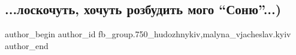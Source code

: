  
 
 
 
 

\subsection{...лоскочуть,  хочуть розбудить мого \enquote{Соню}...)}
\label{sec:10_04_2018.fb.fb_group.750_hudozhnykiv.1.loskochut_hochut_rozbudyty_mogo_sonju}
 
\ifcmt
 author_begin
   author_id fb_group.750_hudozhnykiv,malyna_vjacheslav.kyiv
 author_end
\fi

